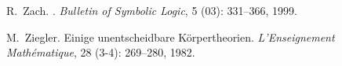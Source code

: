 \documentclass[11pt,fleqn,leqno]{article}
\begin{document}
\begin{thebibliography}{118}
R.~Zach.
.
\newblock \emph{Bulletin of Symbolic Logic}, 5 (03):
  331--366, 1999.

M.~Ziegler.
\newblock Einige unentscheidbare {K}\"orpertheorien.
\newblock \emph{L'Enseignement Math\'ematique}, 28 (3-4):
  269--280, 1982.

\end{thebibliography}
\end{document}
